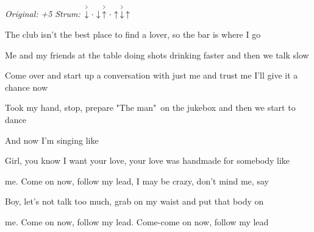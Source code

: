 \begin{song}


\begin{headerbox}
\RaiseBoxWithAccents
\textit{Original: +5} \quad
\textit{Strum:} $\AccentDown\Miss\Down\AccentUp\Miss\Up\AccentDown\Up$
\end{headerbox}

\begin{hchordbox}
\end{hchordbox}

\normalsize

\bigskip

The club isn't the best place to find a lover, so the bar is where I go \par
{}Me and my friends at the table doing shots drinking faster and then we talk slow \par
Come over and start up a conversation with just me and trust me I'll give it a chance now \par
Took my hand, stop, prepare "The man"\ on the jukebox and then we start to dance \par
And now I'm singing like \par

\bigskip

\begin{chorusboxwide}{\PrechorusAndChorus} \par
{}Girl, you know I want your love, your love was handmade for somebody like \par
{}me. Come on now, follow my lead, I may be crazy, don't mind me, say \par
{}Boy, let's not talk too much, grab on my waist and put that body on \par
{}me. Come on now, follow my lead. Come-come on now, follow my lead \par

\bigskip


\end{chorusboxwide}
\end{song}

